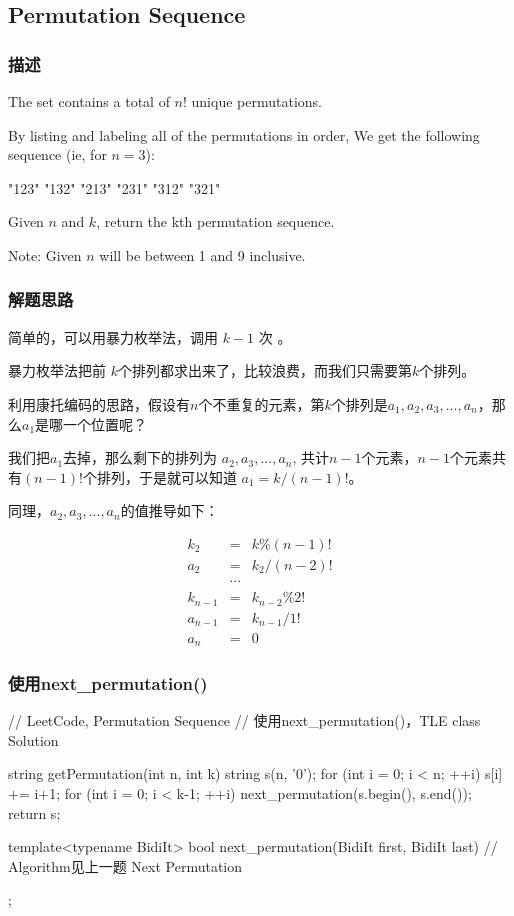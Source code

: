 \subsection{Permutation Sequence} %
\label{sec:permutation-sequence}


\subsubsection{描述}
The set \fn{[1,2,3,…,n]} contains a total of $n!$ unique permutations.

By listing and labeling all of the permutations in order,
We get the following sequence (ie, for $n = 3$):
\begin{Code}
	"123"
	"132"
	"213"
	"231"
	"312"
	"321"
\end{Code}

Given $n$ and $k$, return the kth permutation sequence.

Note: Given $n$ will be between 1 and 9 inclusive.


\subsubsection{解题思路}
简单的，可以用暴力枚举法，调用 $k-1$ 次 。

暴力枚举法把前 $k$个排列都求出来了，比较浪费，而我们只需要第$k$个排列。

利用康托编码的思路，假设有$n$个不重复的元素，第$k$个排列是$a_1, a_2, a_3, ..., 
a_n$，那么$a_1$是哪一个位置呢？

我们把$a_1$去掉，那么剩下的排列为
$a_2, a_3, ..., a_n$, 共计$n-1$个元素，$n-1$个元素共有$(n-1)!$个排列，于是就可以知道 
$a_1 = k / (n-1)!$。

同理，$a_2, a_3, ..., a_n$的值推导如下：

\begin{eqnarray}
	k_2 &=& k\%(n-1)! \nonumber \\
	a_2 &=& k_2/(n-2)! \nonumber \\
	\quad & \cdots \nonumber \\
	k_{n-1} &=& k_{n-2}\%2! \nonumber \\
	a_{n-1} &=& k_{n-1}/1! \nonumber \\
	a_n &=& 0 \nonumber
\end{eqnarray}


\subsubsection{使用next_permutation()}
\begin{Code}
	// LeetCode, Permutation Sequence
	// 使用next_permutation()，TLE
	class Solution {
		string getPermutation(int n, int k) {
			string s(n, '0');
			for (int i = 0; i < n; ++i)
				s[i] += i+1;
			for (int i = 0; i < k-1; ++i)
				next_permutation(s.begin(), s.end());
			return s;
		}
		
		template<typename BidiIt>
		bool next_permutation(BidiIt first, BidiIt last) {
			// Algorithm见上一题 Next Permutation
		}
	};
\end{Code}


